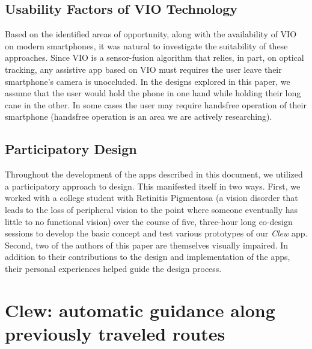 \documentclass[chi_draft]{sigchi}
\begin{document}
\subsection{Usability Factors of VIO Technology}
Based on the identified areas of opportunity, along with the availability of VIO on modern smartphones, it was natural to investigate the suitability of these approaches.  Since VIO is a sensor-fusion algorithm that relies, in part, on optical tracking, any assistive app based on VIO must requires the user leave their smartphone's camera is unoccluded.  In the designs explored in this paper, we assume that the user would hold the phone in one hand while holding their long cane in the other.  In some cases the user may require handsfree operation of their smartphone (handsfree operation is an area we are actively researching).

\subsection{Participatory Design}

Throughout the development of the apps described in this document, we utilized a participatory approach to design.  This manifested itself in two ways.  First, we worked with a college student with Retinitis Pigmentosa (a vision disorder that leads to the loss of peripheral vision to the point where someone eventually has little to no functional vision) over the course of five, three-hour long co-design sessions to develop the basic concept and test various prototypes of our \emph{Clew} app.   Second, two of the authors of this paper are themselves visually impaired.  In addition to their contributions to the design and implementation of the apps, their personal experiences helped guide the design process.

\section{Clew: automatic guidance along previously traveled routes}
\end{document}
